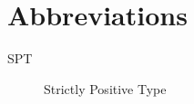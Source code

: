 \chapter*{Abbreviations}\label{abbr}
\begin{description}
\item[SPT] Strictly Positive Type 
\end{description}